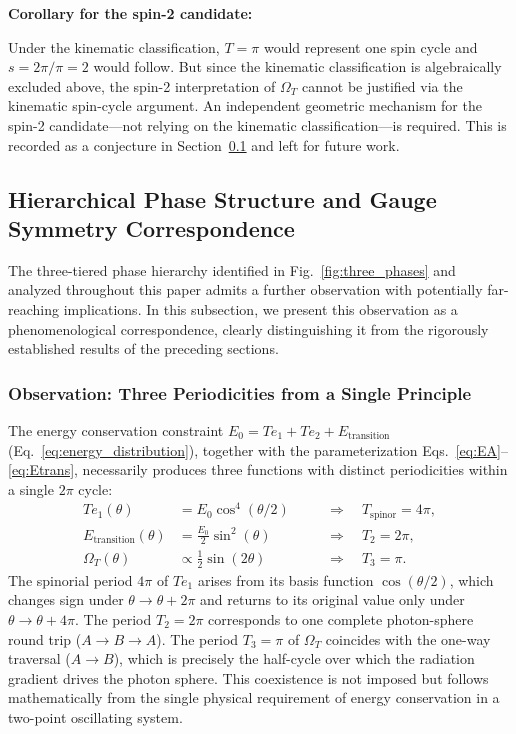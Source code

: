 \documentclass[%
 reprint,
 amsmath,amssymb,
 aps,
 prb,
]{revtex4-2}
\numberwithin{equation}{section}
\theoremstyle{definition}
\theoremstyle{remark}
\begin{document}
\textbf{Corollary for the spin-2 candidate:}

Under the kinematic classification, $T = \pi$ would represent one spin cycle and $s = 2\pi/\pi = 2$ would follow. But since the kinematic classification is algebraically excluded above, the spin-2 interpretation of $\Omega_T$ cannot be justified via the kinematic spin-cycle argument. An independent geometric mechanism for the spin-2 candidate---not relying on the kinematic classification---is required. This is recorded as a conjecture in Section~\ref{sec:gauge_correspondence} and left for future work.

\subsection{Hierarchical Phase Structure and Gauge Symmetry Correspondence}
\label{sec:gauge_correspondence}

The three-tiered phase hierarchy identified in Fig.~\ref{fig:three_phases} and analyzed throughout this paper admits a further observation with potentially far-reaching implications. In this subsection, we present this observation as a phenomenological correspondence, clearly distinguishing it from the rigorously established results of the preceding sections.

\subsubsection{Observation: Three Periodicities from a Single Principle}

The energy conservation constraint $E_0 = Te_1 + Te_2 + E_{\text{transition}}$ (Eq.~\ref{eq:energy_distribution}), together with the parameterization Eqs.~\eqref{eq:EA}--\eqref{eq:Etrans}, necessarily produces three functions with distinct periodicities within a single $2\pi$ cycle:
\begin{align}
Te_1(\theta) &= E_0 \cos^4(\theta/2) \quad &&\Rightarrow \quad T_{\text{spinor}} = 4\pi, \label{eq:period_half} \\
E_{\text{transition}}(\theta) &= \frac{E_0}{2}\sin^2(\theta) \quad &&\Rightarrow \quad T_2 = 2\pi, \label{eq:period_normal} \\
\Omega_T(\theta) &\propto \tfrac{1}{2}\sin(2\theta) \quad &&\Rightarrow \quad T_3 = \pi. \label{eq:period_double}
\end{align}
The spinorial period $4\pi$ of $Te_1$ arises from its basis function $\cos(\theta/2)$, which changes sign under $\theta \to \theta + 2\pi$ and returns to its original value only under $\theta \to \theta + 4\pi$. The period $T_2 = 2\pi$ corresponds to one complete photon-sphere round trip ($A \to B \to A$). The period $T_3 = \pi$ of $\Omega_T$ coincides with the one-way traversal ($A \to B$), which is precisely the half-cycle over which the radiation gradient drives the photon sphere. This coexistence is not imposed but follows mathematically from the single physical requirement of energy conservation in a two-point oscillating system.
\end{document}
